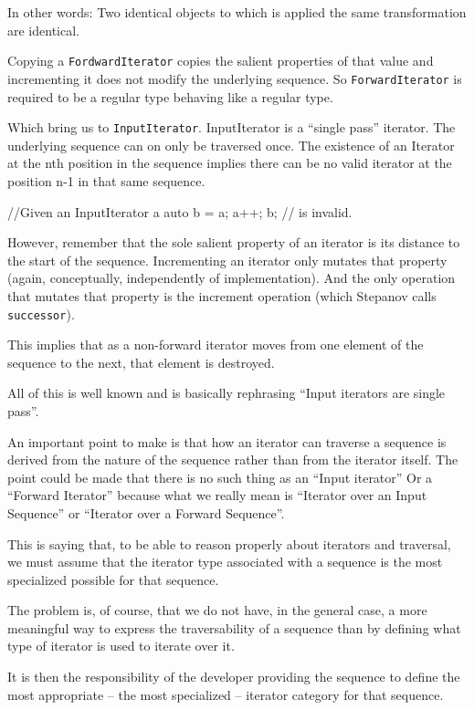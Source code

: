 \documentclass{wg21}
\begin{document}
In other words: Two identical objects to which is applied the same
transformation are identical. 

Copying a \texttt{FordwardIterator} copies
the salient properties of that value and incrementing it does not modify
the underlying sequence. So \texttt{ForwardIterator} is required to be a
regular type behaving like a regular type.

Which bring us to \texttt{InputIterator}. InputIterator is a ``single
pass'' iterator. The underlying sequence can on only be traversed once.
The existence of an Iterator at the nth position in the sequence implies
there can be no valid iterator at the position n-1 in that same
sequence.

\begin{codeblock}
//Given an InputIterator a 
auto b = a; a++;
b; // is invalid.
\end{codeblock}

However, remember that the sole salient property of an iterator is its
distance to the start of the sequence. Incrementing an iterator only
mutates that property (again, conceptually, independently of
implementation). And the only operation that mutates that property is
the increment operation (which Stepanov calls \texttt{successor}).

This implies that as a non-forward iterator moves from one element of
the sequence to the next, that element is destroyed.

All of this is well known and is basically rephrasing ``Input iterators
are single pass''.

An important point to make is that how an iterator can traverse a
sequence is derived from the nature of the sequence rather than from the
iterator itself. The point could be made that there is no such thing as
an ``Input iterator'' Or a ``Forward Iterator'' because what we really
mean is ``Iterator over an Input Sequence'' or ``Iterator over a Forward
Sequence''.

This is saying that, to be able to reason properly about iterators and
traversal, we must assume that the iterator type associated with a
sequence is the most specialized possible for that sequence.

The problem is, of course, that we do not have, in the general case, a
more meaningful way to express the traversability of a sequence than by
defining what type of iterator is used to iterate over it.

It is then the responsibility of the developer providing the sequence to
define the most appropriate -- the most specialized -- iterator category
for that sequence.
\end{document}
